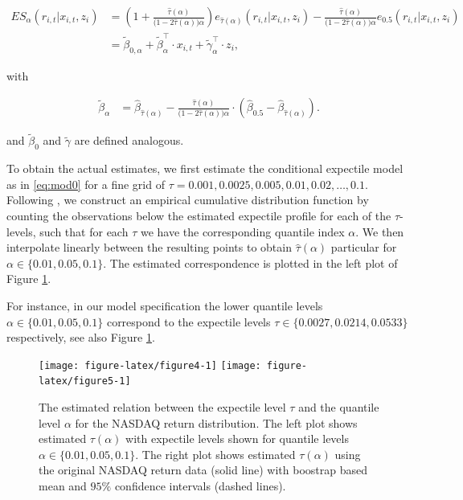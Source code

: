 \documentclass[]{article}
\begin{document}
\begin{align}
ES_{\alpha}(r_{i,t}|x_{i,t},z_i) &= \left(1+\frac{\hat\tau(\alpha)}{\big(1-2\hat\tau(\alpha)\big)\alpha}\right)e_{\hat\tau(\alpha)}(r_{i,t}|x_{i,t},z_i) - \frac{\hat\tau(\alpha)}{\big(1-2\hat\tau(\alpha)\big)\alpha}e_{0.5}(r_{i,t}|x_{i,t},z_i)\nonumber\\
&=\tilde \beta_{0,\alpha} + \tilde\beta_{\alpha}^\top \cdot x_{i,t} + \tilde\gamma_\alpha^\top\cdot z_i,\label{eq:es}
\end{align}

with

\begin{align}
\tilde\beta_\alpha &= \hat \beta_{\hat\tau(\alpha)} - \frac{\hat\tau(\alpha)}{\big(1-2\hat\tau(\alpha)\big)\alpha}\cdot \left(\hat\beta_{0.5} -\hat \beta_{\hat\tau(\alpha)}\right).\label{eq:tbeta}
\end{align}

and \(\tilde\beta_0\) and \(\tilde\gamma\) are defined analogous.

To obtain the actual estimates, we first estimate the conditional expectile model as in \eqref{eq:mod0} for a fine grid of \(\tau = 0.001, 0.0025, 0.005,0.01,0.02,\ldots, 0.1\). Following \cite{Taylor2008}, we construct an empirical cumulative distribution function by counting the observations below the estimated expectile profile for each of the \(\tau\)-levels, such that for each \(\tau\) we have the corresponding quantile index \(\alpha\). We then interpolate linearly between the resulting points to obtain \(\hat\tau(\alpha)\) particular for \(\alpha\in\{0.01,0.05,0.1\}\). The estimated correspondence is plotted in the left plot of Figure \ref{fig:figure4}.

For instance, in our model specification the lower quantile levels \(\alpha\in\{0.01,0.05,0.1\}\) correspond to the expectile levels \(\tau\in\{0.0027,0.0214,0.0533\}\) respectively, see also Figure \ref{fig:figure4}.

\begin{figure}\label{fig:figure4}
\centering
\texttt{[image: figure-latex/figure4-1]}
\texttt{[image: figure-latex/figure5-1]}
\caption{The estimated relation between the expectile level \(\tau\) and the quantile level \(\alpha\) for the NASDAQ return distribution. The left plot shows  estimated $\tau(\alpha)$ with expectile levels shown for quantile levels \(\alpha\in\{0.01,0.05,0.1\}\). The right plot shows estimated $\tau(\alpha)$ using the original NASDAQ return data (solid line) with boostrap based mean and $95\%$ confidence intervals (dashed lines).}\vspace{-0.5cm}
\end{figure}
\end{document}
